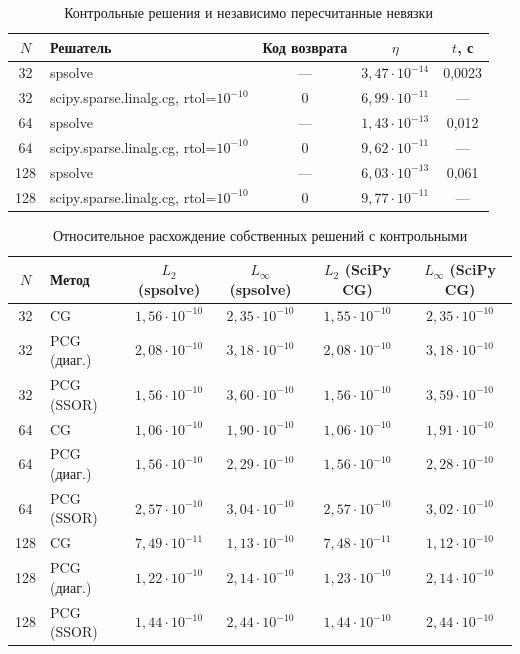 \documentclass[12pt]{article}
\begin{document}
\begin{table}[H]
\centering
\caption{Контрольные решения и независимо пересчитанные невязки}
\label{tab:ctrl}
\small
\begin{tabular}{|c|l|c|c|c|}
\hline
$N$ & Решатель & Код возврата & $\eta$ & $t$, с \\
\hline
32 & spsolve & --- & $3{,}47\cdot10^{-14}$ & 0,0023 \\ \hline
32 & scipy.sparse.linalg.cg, rtol=$10^{-10}$ & 0 & $6{,}99\cdot10^{-11}$ & ---  \\
64 & spsolve & --- & $1{,}43\cdot10^{-13}$ & 0,012 \\ \hline
64 & scipy.sparse.linalg.cg, rtol=$10^{-10}$ & 0 & $9{,}62\cdot10^{-11}$ & ---  \\
128 & spsolve & --- & $6{,}03\cdot10^{-13}$ & 0,061 \\ \hline
128 & scipy.sparse.linalg.cg, rtol=$10^{-10}$ & 0 & $9{,}77\cdot10^{-11}$ & ---  \\
\hline
\end{tabular}
\end{table}

\begin{table}[H]
\centering
\caption{Относительное расхождение собственных решений с контрольными}
\label{tab:cmp}
\small
\begin{tabular}{|c|l|c|c|c|c|}
\hline
$N$ & Метод & $L_2$ (spsolve) & $L_\infty$ (spsolve) & $L_2$ (SciPy CG) & $L_\infty$ (SciPy CG) \\
\hline
32 & CG & $1{,}56\cdot10^{-10}$ & $2{,}35\cdot10^{-10}$ & $1{,}55\cdot10^{-10}$ & $2{,}35\cdot10^{-10}$ \\
32 & PCG (диаг.) & $2{,}08\cdot10^{-10}$ & $3{,}18\cdot10^{-10}$ & $2{,}08\cdot10^{-10}$ & $3{,}18\cdot10^{-10}$ \\
32 & PCG (SSOR) & $1{,}56\cdot10^{-10}$ & $3{,}60\cdot10^{-10}$ & $1{,}56\cdot10^{-10}$ & $3{,}59\cdot10^{-10}$ \\
64 & CG & $1{,}06\cdot10^{-10}$ & $1{,}90\cdot10^{-10}$ & $1{,}06\cdot10^{-10}$ & $1{,}91\cdot10^{-10}$ \\
64 & PCG (диаг.) & $1{,}56\cdot10^{-10}$ & $2{,}29\cdot10^{-10}$ & $1{,}56\cdot10^{-10}$ & $2{,}28\cdot10^{-10}$ \\
64 & PCG (SSOR) & $2{,}57\cdot10^{-10}$ & $3{,}04\cdot10^{-10}$ & $2{,}57\cdot10^{-10}$ & $3{,}02\cdot10^{-10}$ \\
128 & CG & $7{,}49\cdot10^{-11}$ & $1{,}13\cdot10^{-10}$ & $7{,}48\cdot10^{-11}$ & $1{,}12\cdot10^{-10}$ \\
128 & PCG (диаг.) & $1{,}22\cdot10^{-10}$ & $2{,}14\cdot10^{-10}$ & $1{,}23\cdot10^{-10}$ & $2{,}14\cdot10^{-10}$ \\
128 & PCG (SSOR) & $1{,}44\cdot10^{-10}$ & $2{,}44\cdot10^{-10}$ & $1{,}44\cdot10^{-10}$ & $2{,}44\cdot10^{-10}$ \\
\hline
\end{tabular}
\end{table}
\end{document}
